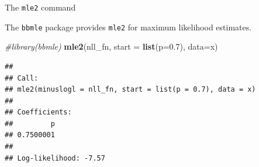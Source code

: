 \documentclass[
  ignorenonframetext,
]{beamer}
\newenvironment{Shaded}{\begin{snugshade}}{\end{snugshade}}
\newcommand{\CommentTok}[1]{\textcolor[rgb]{0.56,0.35,0.01}{\textit{#1}}}
\newcommand{\DataTypeTok}[1]{\textcolor[rgb]{0.13,0.29,0.53}{#1}}
\newcommand{\FloatTok}[1]{\textcolor[rgb]{0.00,0.00,0.81}{#1}}
\newcommand{\KeywordTok}[1]{\textcolor[rgb]{0.13,0.29,0.53}{\textbf{#1}}}
\newcommand{\NormalTok}[1]{#1}
\begin{document}
\begin{frame}[fragile]{The \texttt{mle2} command}
\protect\hypertarget{the-mle2-command}{}

The \texttt{bbmle} package provides \texttt{mle2} for maximum likelihood
estimates.

\scriptsize

\begin{Shaded}
\begin{Highlighting}[]
\CommentTok{#library(bbmle)}
\KeywordTok{mle2}\NormalTok{(nll_fn, }\DataTypeTok{start =} \KeywordTok{list}\NormalTok{(}\DataTypeTok{p=}\FloatTok{0.7}\NormalTok{), }\DataTypeTok{data=}\NormalTok{x)}
\end{Highlighting}
\end{Shaded}

\begin{verbatim}
## 
## Call:
## mle2(minuslogl = nll_fn, start = list(p = 0.7), data = x)
## 
## Coefficients:
##         p 
## 0.7500001 
## 
## Log-likelihood: -7.57
\end{verbatim}

\end{frame}
\end{document}

